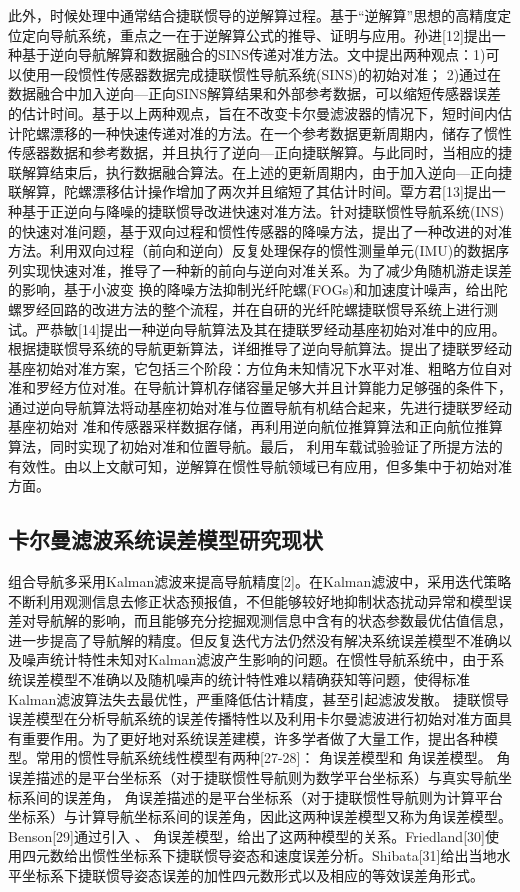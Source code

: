 此外，时候处理中通常结合捷联惯导的逆解算过程。基于“逆解算”思想的高精度定位定向导航系统，重点之一在于逆解算公式的推导、证明与应用。孙进[12]提出一种基于逆向导航解算和数据融合的SINS传递对准方法。文中提出两种观点：1)可以使用一段惯性传感器数据完成捷联惯性导航系统(SINS)的初始对准； 2)通过在数据融合中加入逆向—正向SINS解算结果和外部参考数据，可以缩短传感器误差的估计时间。基于以上两种观点，旨在不改变卡尔曼滤波器的情况下，短时间内估计陀螺漂移的一种快速传递对准的方法。在一个参考数据更新周期内，储存了惯性传感器数据和参考数据，并且执行了逆向—正向捷联解算。与此同时，当相应的捷联解算结束后，执行数据融合算法。在上述的更新周期内，由于加入逆向—正向捷联解算，陀螺漂移估计操作增加了两次并且缩短了其估计时间。覃方君[13]提出一种基于正逆向与降噪的捷联惯导改进快速对准方法。针对捷联惯性导航系统(INS)的快速对准问题，基于双向过程和惯性传感器的降噪方法，提出了一种改进的对准方法。利用双向过程（前向和逆向）反复处理保存的惯性测量单元(IMU)的数据序列实现快速对准，推导了一种新的前向与逆向对准关系。为了减少角随机游走误差的影响，基于小波变 换的降噪方法抑制光纤陀螺(FOGs)和加速度计噪声，给出陀螺罗经回路的改进方法的整个流程，并在自研的光纤陀螺捷联惯导系统上进行测试。严恭敏[14]提出一种逆向导航算法及其在捷联罗经动基座初始对准中的应用。根据捷联惯导系统的导航更新算法，详细推导了逆向导航算法。提出了捷联罗经动基座初始对准方案，它包括三个阶段：方位角未知情况下水平对准、粗略方位自对准和罗经方位对准。在导航计算机存储容量足够大并且计算能力足够强的条件下，通过逆向导航算法将动基座初始对准与位置导航有机结合起来，先进行捷联罗经动基座初始对 准和传感器采样数据存储，再利用逆向航位推算算法和正向航位推算算法，同时实现了初始对准和位置导航。最后， 利用车载试验验证了所提方法的有效性。由以上文献可知，逆解算在惯性导航领域已有应用，但多集中于初始对准方面。

\subsection{卡尔曼滤波系统误差模型研究现状}
 组合导航多采用Kalman滤波来提高导航精度[2]。在Kalman滤波中，采用迭代策略不断利用观测信息去修正状态预报值，不但能够较好地抑制状态扰动异常和模型误差对导航解的影响，而且能够充分挖掘观测信息中含有的状态参数最优估值信息，进一步提高了导航解的精度。但反复迭代方法仍然没有解决系统误差模型不准确以及噪声统计特性未知对Kalman滤波产生影响的问题。在惯性导航系统中，由于系统误差模型不准确以及随机噪声的统计特性难以精确获知等问题，使得标准Kalman滤波算法失去最优性，严重降低估计精度，甚至引起滤波发散。
 捷联惯导误差模型在分析导航系统的误差传播特性以及利用卡尔曼滤波进行初始对准方面具有重要作用。为了更好地对系统误差建模，许多学者做了大量工作，提出各种模型。常用的惯性导航系统线性模型有两种[27-28]： 角误差模型和 角误差模型。 角误差描述的是平台坐标系（对于捷联惯性导航则为数学平台坐标系）与真实导航坐标系间的误差角， 角误差描述的是平台坐标系（对于捷联惯性导航则为计算平台坐标系）与计算导航坐标系间的误差角，因此这两种误差模型又称为角误差模型。Benson[29]通过引入 、  角误差模型，给出了这两种模型的关系。Friedland[30]使用四元数给出惯性坐标系下捷联惯导姿态和速度误差分析。Shibata[31]给出当地水平坐标系下捷联惯导姿态误差的加性四元数形式以及相应的等效误差角形式。


